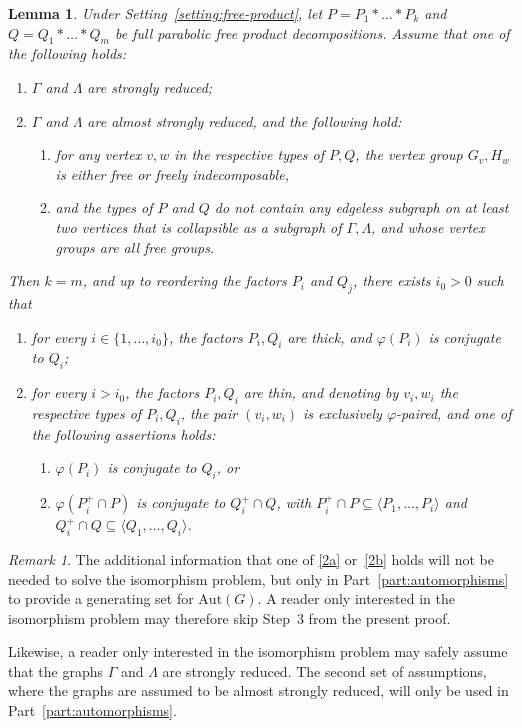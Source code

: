 \documentclass[a4paper,english,11pt]{article}
\newtheorem{lemma}[de]{Lemma}
\theoremstyle{definition}
\theoremstyle{remark}
\newtheorem{rk}[de]{Remark}
\newcommand{\Aut}{\mathrm{Aut}}
\begin{document}
\begin{lemma}\label{lemma:free-product-1}
Under Setting~\ref{setting:free-product}, let $P=P_1\ast\dots\ast P_k$ and $Q=Q_1\ast\dots\ast Q_m$ be full parabolic free product decompositions. Assume that one of the following holds: 
\begin{enumerate}
\item $\Gamma$ and $\Lambda$ are strongly reduced;
\item $\Gamma$ and $\Lambda$ are almost strongly reduced, and the following hold: 
\begin{enumerate}
\item for any vertex $v,w$ in the respective types of $P,Q$, the vertex group $G_v,H_w$ is either free or freely indecomposable,
\item and the types of $P$ and $Q$ do not contain any edgeless subgraph on at least two vertices that is collapsible as a subgraph of $\Gamma,\Lambda$, and whose vertex groups are all free groups.
\end{enumerate}
\end{enumerate}
Then $k=m$, and up to reordering the factors $P_i$ and $Q_j$, there exists $i_0>0$ such that 
\begin{enumerate}
\item for every $i\in\{1,\dots,i_0\}$, the factors $P_i,Q_i$ are thick, and $\varphi(P_i)$ is conjugate to $Q_i$; 
\item for every $i>i_0$, the factors $P_i,Q_i$ are thin, and denoting by $v_i,w_i$ the respective types of $P_i,Q_i$, the pair $(v_i,w_i)$ is exclusively $\varphi$-paired, and one of the following assertions holds:
\begin{enumerate}
\item\label{2a} $\varphi(P_i)$ is conjugate to $Q_i$, or 
\item\label{2b} $\varphi(P_i^+\cap P)$ is conjugate to $Q_i^+\cap Q$, with $P_i^+\cap P \subseteq\langle P_1,\dots,P_i\rangle$ and $Q_i^+\cap Q\subseteq \langle Q_1,\dots,Q_i\rangle$.
\end{enumerate}
\end{enumerate}
\end{lemma}

\begin{rk}
The additional information that one of \ref{2a} or~\ref{2b} holds will not be needed to solve the isomorphism problem, but only in Part~\ref{part:automorphisms} to provide a generating set for $\Aut(G)$. A reader only interested in the isomorphism problem may therefore skip Step~3 from the present proof.

Likewise, a reader only interested in the isomorphism problem may safely assume that the graphs $\Gamma$ and $\Lambda$ are strongly reduced. The second set of assumptions, where the graphs are assumed to be almost strongly reduced, will only be used in Part~\ref{part:automorphisms}.
\end{rk}
\end{document}
